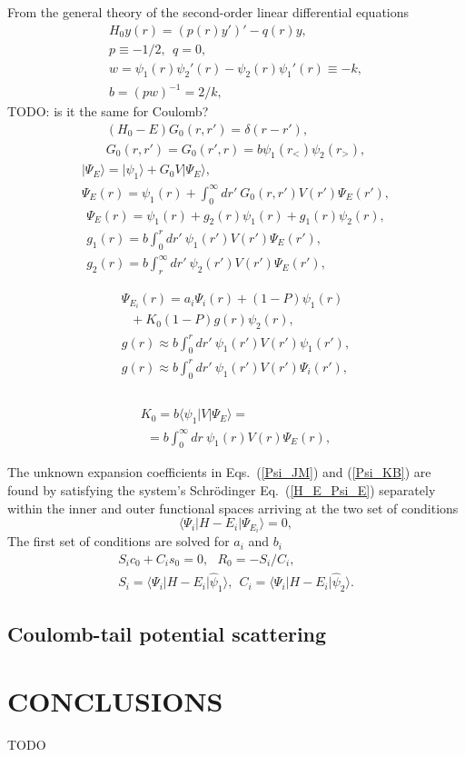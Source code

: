 \documentclass[aip
, pra
, showpacs
, aps
, twocolumn
, groupedaddress
, floatfix
]{revtex4}
\newcommand{\beq}{\begin{equation}}
\newcommand{\eeq}{\end{equation}}
\newcommand{\barr}{\begin{array}}
\newcommand{\earr}{\end{array}}
\begin{document}
From the general theory of the second-order linear differential equations
\beq \barr{l}
H_0 y(r) = (p(r) y')' - q(r) y,\\
p \equiv -1/2, \ \ q = 0,\\
w = \psi_1(r) \psi_2'(r) - \psi_2(r) \psi_1'(r) \equiv -k,\\
b = (pw)^{-1}= 2/k,
\earr \eeq
TODO: is it the same for Coulomb?
\beq \barr{l}
(H_0 - E) G_0(r,r') = \delta(r-r'),\\
G_0(r,r') = G_0(r',r) = b \psi_1(r_{<}) \psi_2(r_{>}),
\earr \eeq
\beq \barr{l}
| \Psi_E \rangle = | \psi_1 \rangle + G_0 V |\Psi_E \rangle,\\
\Psi_E(r) = \psi_1(r) +  \int_0^\infty dr'\ G_0(r,r') V(r') \Psi_E(r'),
\earr \eeq
\beq \barr{l}
\Psi_E(r) = \psi_1(r) +  g_2(r) \psi_1(r) + g_1(r) \psi_2(r),\\
g_1(r) = b \int_0^r dr'\ \psi_1(r') V(r') \Psi_E(r'), \\
g_2(r) = b \int_r^\infty dr'\ \psi_2(r') V(r') \Psi_E(r'),
\earr \eeq

\beq \barr{l}
\Psi_{E_i}(r) = a_i \Psi_i(r)  + (1-P)\psi_1(r)  \\
\ \ \ + K_0 (1-P)g(r)\psi_2(r),\\
g(r) \approx b \int_0^r dr'\ \psi_1(r') V(r') \psi_1(r'), \\
g(r) \approx b \int_0^r dr'\ \psi_1(r') V(r') \Psi_i(r'), \\
\earr \eeq

\beq \barr{l}
\earr \eeq
\beq \barr{l}
K_0 = b \langle \psi_1 | V | \Psi_E \rangle =\\
\ \ = b \int_0^\infty  dr\ \psi_1(r) V(r) \Psi_E(r),
\earr \eeq




The unknown expansion coefficients in Eqs.~(\ref{Psi_JM}) and (\ref{Psi_KB})
are found by satisfying the system's  Schr\"odinger Eq.~(\ref{H_E_Psi_E})
separately within the inner and outer functional spaces
arriving at the two set of conditions
\beq
\langle\Psi_i|H-E_i|\Psi_{E_i}\rangle=0,
\eeq
The first set of conditions are solved for $a_i$ and $b_i$
\beq \barr{l}
S_i c_0 + C_i s_0 = 0, \ \ \
R_0 = - S_i / C_i, \\
S_i = \langle\Psi_i|H-E_i|  \hat{\psi}_1 \rangle, \ \
C_i = \langle\Psi_i|H-E_i|  \hat{\psi}_2 \rangle.
\earr \eeq






\subsection{Coulomb-tail potential scattering}



\section{CONCLUSIONS}
TODO


\begin{acknowledgments}
\end{acknowledgments}





%
\end{document}

